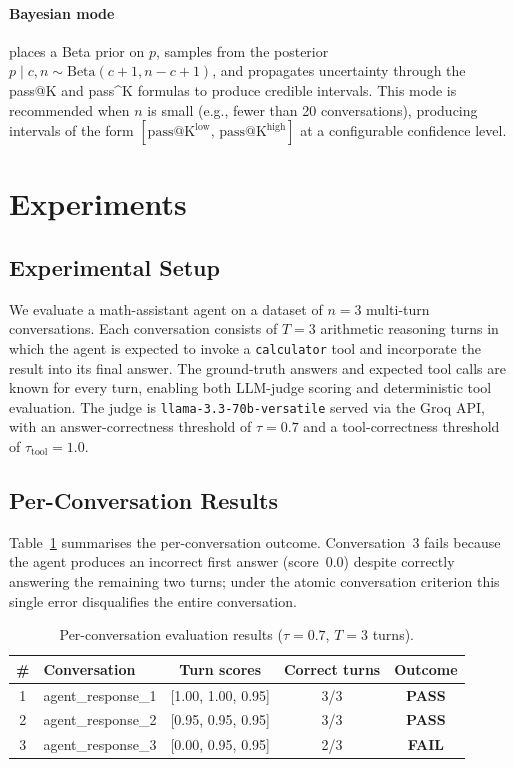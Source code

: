 \documentclass[11pt,a4paper]{article}
\begin{document}
\paragraph{Bayesian mode} places a Beta prior on $p$, samples from the
posterior $p \mid c, n \sim \text{Beta}(c+1, n-c+1)$, and propagates
uncertainty through the pass@K and pass\^{}K formulas to produce credible
intervals. This mode is recommended when $n$ is small (e.g., fewer than 20
conversations), producing intervals of the form
$[\text{pass@K}^{\text{low}},\, \text{pass@K}^{\text{high}}]$ at a
configurable confidence level.

\section{Experiments}
\label{sec:results}

\subsection{Experimental Setup}

We evaluate a math-assistant agent on a dataset of $n = 3$ multi-turn
conversations. Each conversation consists of $T = 3$ arithmetic reasoning
turns in which the agent is expected to invoke a \texttt{calculator} tool
and incorporate the result into its final answer. The ground-truth answers
and expected tool calls are known for every turn, enabling both LLM-judge
scoring and deterministic tool evaluation. The judge is \texttt{llama-3.3-70b-versatile}
served via the Groq API, with an answer-correctness threshold of $\tau = 0.7$
and a tool-correctness threshold of $\tau_{\text{tool}} = 1.0$.

\subsection{Per-Conversation Results}

Table~\ref{tab:results} summarises the per-conversation outcome.
Conversation~3 fails because the agent produces an incorrect first answer
(score~0.0) despite correctly answering the remaining two turns;
under the atomic conversation criterion this single error disqualifies
the entire conversation.

\begin{table}[htbp]
\centering
\caption{Per-conversation evaluation results ($\tau = 0.7$, $T = 3$ turns).}
\label{tab:results}
\begin{tabular}{clccc}
\toprule
\textbf{\#} & \textbf{Conversation} & \textbf{Turn scores} & \textbf{Correct turns} & \textbf{Outcome} \\
\midrule
1 & agent\_response\_1 & [1.00, 1.00, 0.95] & 3/3 & \textbf{PASS} \\
2 & agent\_response\_2 & [0.95, 0.95, 0.95] & 3/3 & \textbf{PASS} \\
3 & agent\_response\_3 & [0.00, 0.95, 0.95] & 2/3 & \textbf{FAIL} \\
\bottomrule
\end{tabular}
\end{table}
\end{document}
